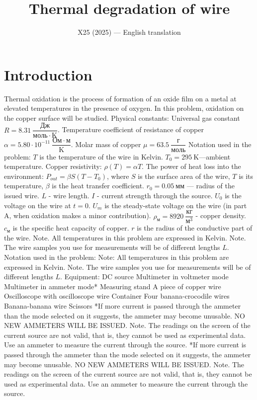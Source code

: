 \documentclass[11pt,a4paper]{article}
\title{\textbf{Thermal degradation of wire}}
\author{\normalsize X25 (2025) — English translation}
\date{}
\begin{document}
\maketitle
\section*{Introduction}
Thermal oxidation is the process of formation of an oxide film on a metal at elevated temperatures in the presence of oxygen. In this problem, oxidation on the copper surface will be studied.
Physical constants: Universal gas constant $R=8.31~\dfrac{Дж}{моль\cdot \mathrm{K}}$. Temperature coefficient of resistance of copper $\alpha = 5.80\cdot 10^{-11}~\dfrac{Ом\cdot м}{\mathrm{K}}$. Molar mass of copper $\mu = 63.5~\dfrac{г}{моль}$ Notation used in the problem: $T$ is the temperature of the wire in Kelvin. $T_0=295~\mathrm{K}$—ambient temperature. Copper resistivity: $\rho (T) = \alpha T$. The power of heat loss into the environment: $P_{out} = \beta S (T- T_0)$, where $S$ is the surface area of ​​the wire, $T$ is its temperature, $\beta $ is the heat transfer coefficient. $r_0=0.05~мм$ — radius of the issued wire. $L$ - wire length. $I$ - current strength through the source. $U_0$ is the voltage on the wire at $t=0$. $U_m$ is the steady-state voltage on the wire (in part A, when oxidation makes a minor contribution). $\rho_{м} = 8920~\dfrac{кг}{м^3}$ - copper density. $c_{м}$ is the specific heat capacity of copper. $r$ is the radius of the conductive part of the wire. Note. All temperatures in this problem are expressed in Kelvin. Note. The wire samples you use for measurements will be of different lengths $L$.
Notation used in the problem:
Note: All temperatures in this problem are expressed in Kelvin.
Note. The wire samples you use for measurements will be of different lengths $L$.
Equipment: DC source Multimeter in voltmeter mode Multimeter in ammeter mode* Measuring stand A piece of copper wire Oscilloscope with oscilloscope wire Container Four banana-crocodile wires Banana-banana wire Scissors *If more current is passed through the ammeter than the mode selected on it suggests, the ammeter may become unusable. NO NEW AMMETERS WILL BE ISSUED. Note. The readings on the screen of the current source are not valid, that is, they cannot be used as experimental data. Use an ammeter to measure the current through the source.
*If more current is passed through the ammeter than the mode selected on it suggests, the ammeter may become unusable. NO NEW AMMETERS WILL BE ISSUED.
Note. The readings on the screen of the current source are not valid, that is, they cannot be used as experimental data. Use an ammeter to measure the current through the source.
\end{document}
